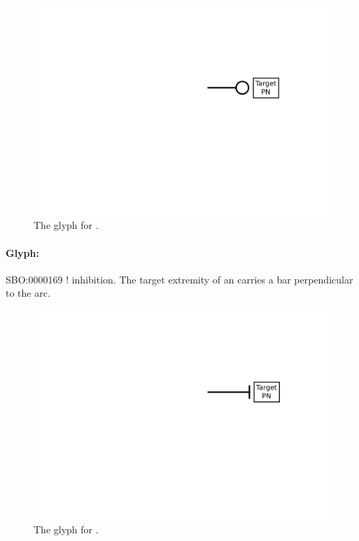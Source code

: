 \begin{figure}[htb]
  \centering
  \includegraphics[scale = 0.5]{images/catalysis}
  \caption{The \PD glyph for .}
  \label{fig:techref:catalysis}
\end{figure}


\paragraph{Glyph: }\label{sec:techref:inhibition}


\begin{glyphDescription}
 \glyphSboTerm SBO:0000169 ! inhibition.
 \glyphNode The target extremity of an  carries a bar perpendicular to the arc.
 \end{glyphDescription}

\begin{figure}[htb]
  \centering
  \includegraphics[scale = 0.5]{images/inhibition}
  \caption{The \PD glyph for .}
  \label{fig:techref:inhibition}
\end{figure}



